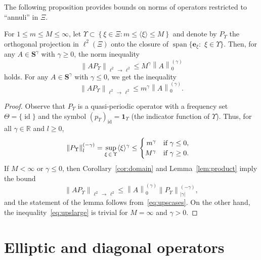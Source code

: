 \documentclass[AHL,Unicode,longabstracts,published]{cedram}
\DeclareMathOperator{\spann}{span}
\DeclareMathOperator{\id}{id}
\newcommand{\R}{\mathbb R}
\newcommand{\bone}{\boldsymbol 1}
\newcommand{\BS}{\mathbf S}
\newcommand{\be}{\mathbf e}
\renewcommand{\subseteq}{\subset}
\newcommand{\abs}[1]{\left\lvert #1 \right\rvert}
\newcommand{\set}[1]{\left\{ #1 \right\}}
\newcommand{\norm}[1]{\left\| #1 \right\|}
\newcommand{\snorm}[3]{\left\| #1\right\|_{#3}^{(#2)}}
\newcommand{\ang}[1]{\langle #1 \rangle}
\begin{document}
The following proposition provides bounds on norms of operators restricted to ``annuli'' in $\Xi$.

\begin{prop}\label{prop:normorder}
For $1 \le m \le M \le \infty$, let $\Upsilon \subseteq \set{\xi \in \Xi : m \le \ang \xi \le M}$ and denote by $P_{\Upsilon}$ the orthogonal projection in $\ell^2(\Xi)$ onto the closure of $\spann \{\be_\xi :$ \linebreak$\xi \in \Upsilon\}$. Then, for any $A \in \BS^\gamma$ with $\gamma \ge 0$, the norm inequality
\begin{equation}\label{eq:upslarge}
\norm{A P_\Upsilon}_{\ell^2\,\to\,\ell^2} \le M^\gamma\snorm{A}{\gamma}{0}
\end{equation}
holds. For any $A \in \BS^\gamma$ with $\gamma \le 0$, we get the inequality
\begin{equation}
\norm{A P_\Upsilon}_{\ell^2\,\to\,\ell^2} \le m^\gamma\snorm{A}{\gamma}{0}.
\end{equation}
\end{prop}
\begin{proof}
Observe that $P_\Upsilon$ is a quasi-periodic operator with a frequency set $\Theta=\{\id\}$ and the symbol $(p_\Upsilon)_{\id} =\bone_{\Upsilon}$ (the indicator function of $\Upsilon$). Thus, for all $\gamma\in\R$ and $l\geq0$,
\begin{equation}\label{eq:upscases}
\begin{aligned}
\snorm{P_\Upsilon}{-\gamma}{l} &= \sup_{\xi \,\in\,\Upsilon} \ang \xi^\gamma \leq
\begin{cases}
\hfill m^\gamma &\text{if } \gamma \le 0, \\
\hfill M^\gamma &\text{if } \gamma \ge 0.
\end{cases}
\end{aligned}
\end{equation}
If $M < \infty$ or $\gamma \le 0$, then Corollary~\ref{cor:domain} and Lemma~\ref{lem:product} imply the bound
\begin{equation}
\norm{A P_\Upsilon}_{\ell^2\,\to\,\ell^2} \le \snorm{A}{\gamma}{0} \snorm{P_\Upsilon}{-\gamma}{\abs{\gamma}},
\end{equation}
and the statement of the lemma follows from~\eqref{eq:upscases}. On the other hand, the inequality~\eqref{eq:upslarge} is trivial for $M = \infty$ and $\gamma > 0$.
\end{proof}


\section{Elliptic and diagonal operators}\label{sec:perturbation}
\end{document}
